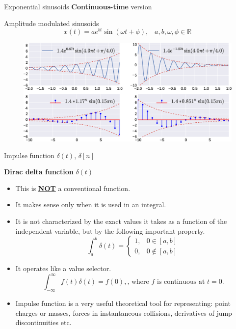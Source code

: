 \documentclass{beamer}
\begin{document}
\begin{frame}{Exponential sinusoids}
\textbf{Continuous-time} version

Amplitude modulated sinusoids
\[ x(t) = a e^{bt} \sin \left(\omega t + \phi \right), \,\,\,\,\, a, b, \omega, \phi \in \mathbb{R}\]

\begin{figure}
\includegraphics[width=\textwidth]{img/exp_sin.eps}
\end{figure}

\end{frame}

\begin{frame}{Impulse function $\delta(t)$, $\delta[n]$}

\textbf{Dirac delta function} $\delta(t)$

\begin{itemize}
\item This is \textbf{\underline{NOT}} a conventional function.
\item It makes sense only when it is used in an integral.
\item It is not characterized by the exact values it takes as a function of the independent variable, but by the following important property.
\[ \int_{a}^{b}\delta (t) = \begin{cases}
1, & 0 \in [a,b] \\
0, & 0 \notin [a, b]
\end{cases} \]
\item It operates like a value selector.
\[ \int_{-\infty}^{\infty}f(t)\delta (t) = f(0), \text{, where $f$ is continuous at } t= 0. \]
\item Impulse function is a very useful theoretical tool for representing: point charges or masses, forces in instantaneous collisions, derivatives of jump discontinuities etc.
\end{itemize}
\end{frame}
\end{document}
